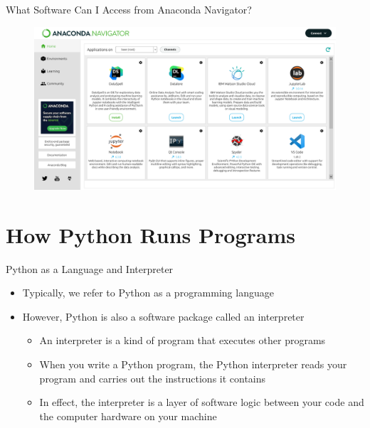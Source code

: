 \documentclass[aspectratio=1610]{beamer}
\begin{document}
\begin{frame}[c]{What Software Can I Access from Anaconda Navigator?}
	\begin{figure}  
		\includegraphics[width=1\textwidth]{images/anaconda_navigator}
	\end{figure}
\end{frame}

\section{How Python Runs Programs}

\begin{frame}[c]{Python as a Language and Interpreter}
	\begin{itemize}
	\item Typically, we refer to Python as a programming language
	\item However, Python is also a software package called an interpreter
	\begin{itemize}
		\item An interpreter is a kind of program that executes other programs
		\item When you write a Python program, the Python interpreter reads your program and carries out the instructions it contains
		\item In effect, the interpreter is a layer of software logic between your code and the computer hardware on your machine
	\end{itemize}
	\end{itemize}
\end{frame}
\end{document}
